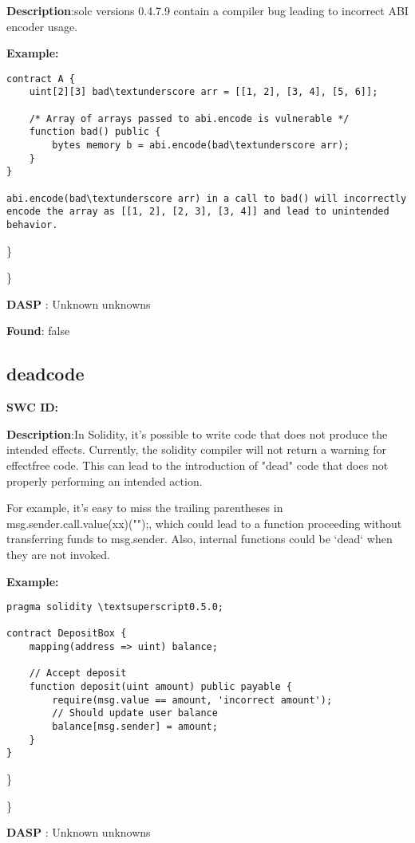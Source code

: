\documentclass{article}
\begin{document}
\textbf{Description}:solc versions 0.4.7.9 contain a compiler bug leading to incorrect ABI encoder usage.


\textbf{Example:} 
\begin{verbatim}
contract A {
    uint[2][3] bad\textunderscore arr = [[1, 2], [3, 4], [5, 6]];

    /* Array of arrays passed to abi.encode is vulnerable */
    function bad() public {
        bytes memory b = abi.encode(bad\textunderscore arr);
    }
}

abi.encode(bad\textunderscore arr) in a call to bad() will incorrectly encode the array as [[1, 2], [2, 3], [3, 4]] and lead to unintended behavior.

\end{verbatim}\} 

\} 

\textbf{DASP} : Unknown unknowns

\textbf{Found}: false

\subsection{dead\textunderscore code} 
\textbf{SWC \textunderscore ID:} 

\textbf{Description}:In Solidity, it's possible to write code that does not produce the intended effects. Currently, the solidity compiler will not return a warning for effect\textendash free code. This can lead to the introduction of "dead" code that does not properly performing an intended action.

For example, it's easy to miss the trailing parentheses in msg.sender.call.value(xx)("");, which could lead to a function proceeding without transferring funds to msg.sender. Also, internal functions could be `dead` when they are not invoked.


\textbf{Example:} 
\begin{verbatim}
pragma solidity \textsuperscript0.5.0;

contract DepositBox {
    mapping(address => uint) balance;

    // Accept deposit
    function deposit(uint amount) public payable {
        require(msg.value == amount, 'incorrect amount');
        // Should update user balance
        balance[msg.sender] = amount;
    }
}

\end{verbatim}\} 

\} 

\textbf{DASP} : Unknown unknowns
\end{document}
